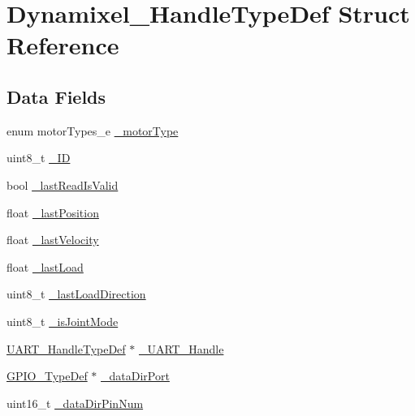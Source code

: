 \hypertarget{struct_dynamixel___handle_type_def}{}\section{Dynamixel\+\_\+\+Handle\+Type\+Def Struct Reference}
\label{struct_dynamixel___handle_type_def}
\subsection*{Data Fields}
\begin{DoxyCompactItemize}
\item 
enum motor\+Types\+\_\+e \mbox{\hyperlink{struct_dynamixel___handle_type_def_aefe5d348d9db9ec81956535e9a04c5ac}{\+\_\+motor\+Type}}
\item 
uint8\+\_\+t \mbox{\hyperlink{struct_dynamixel___handle_type_def_ac07cb35228843be781e258bd39485d6a}{\+\_\+\+ID}}
\item 
bool \mbox{\hyperlink{struct_dynamixel___handle_type_def_a9bd336b14eaeadc645922eee290bb0ad}{\+\_\+last\+Read\+Is\+Valid}}
\item 
float \mbox{\hyperlink{struct_dynamixel___handle_type_def_a2e8a4d000bb45bf784fcbb56ebbfc10c}{\+\_\+last\+Position}}
\item 
float \mbox{\hyperlink{struct_dynamixel___handle_type_def_a46adc1a0c9e0288ba60b06cfc345adea}{\+\_\+last\+Velocity}}
\item 
float \mbox{\hyperlink{struct_dynamixel___handle_type_def_ad411c71835cb7b17b9818d2836470d10}{\+\_\+last\+Load}}
\item 
uint8\+\_\+t \mbox{\hyperlink{struct_dynamixel___handle_type_def_ab2cead07066dc9f83aa1d8ea7f8b4b54}{\+\_\+last\+Load\+Direction}}
\item 
uint8\+\_\+t \mbox{\hyperlink{struct_dynamixel___handle_type_def_a1e1aecddb114d4e14ff464c0565a1a0c}{\+\_\+is\+Joint\+Mode}}
\item 
\mbox{\hyperlink{struct_u_a_r_t___handle_type_def}{U\+A\+R\+T\+\_\+\+Handle\+Type\+Def}} $\ast$ \mbox{\hyperlink{struct_dynamixel___handle_type_def_aefc481817957faca32bb883a5a497603}{\+\_\+\+U\+A\+R\+T\+\_\+\+Handle}}
\item 
\mbox{\hyperlink{struct_g_p_i_o___type_def}{G\+P\+I\+O\+\_\+\+Type\+Def}} $\ast$ \mbox{\hyperlink{struct_dynamixel___handle_type_def_a5157edbd5a8183183a2a2d45b3c8be0d}{\+\_\+data\+Dir\+Port}}
\item 
uint16\+\_\+t \mbox{\hyperlink{struct_dynamixel___handle_type_def_a83700584e6d6b79965f6c42d0b92148e}{\+\_\+data\+Dir\+Pin\+Num}}
\end{DoxyCompactItemize}


